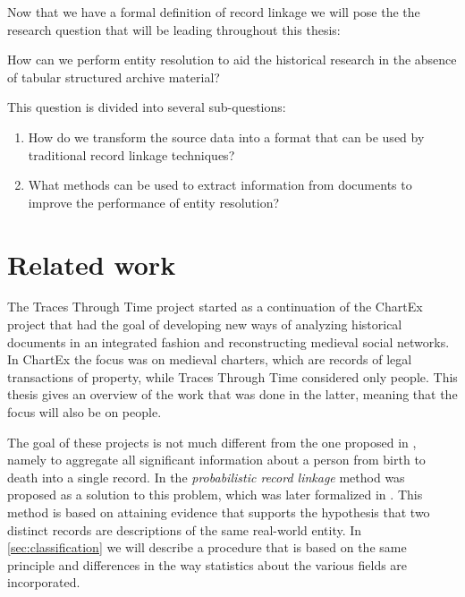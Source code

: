Now that we have a formal definition of record linkage we will pose the the research question that will be leading throughout this thesis:

\begin{question*}
    How can we perform entity resolution to aid the historical research in the absence of tabular structured archive material?
\end{question*}

\noindent This question is divided into several sub-questions:

\begin{enumerate}[label=\emph{\roman*.}]
    \item How do we transform the source data into a format that can be used by traditional record linkage techniques?
    \item What methods can be used to extract information from documents to improve the performance of entity resolution?
\end{enumerate}




\section{Related work}
\label{sec:related_work}

The Traces Through Time project started as a continuation of the ChartEx \citep{Knobbe2014} project that had the goal of developing new ways of analyzing historical documents in an integrated fashion and reconstructing medieval social networks.
In ChartEx the focus was on medieval charters, which are records of legal transactions of property, while Traces Through Time considered only people.
This thesis gives an overview of the work that was done in the latter, meaning that the focus will also be on people.

The goal of these projects is not much different from the one proposed in \citep{Dunn1946}, namely to aggregate all significant information about a person from birth to death into a single record.
In \citep{Newcombe1959} the \emph{probabilistic record linkage} method was proposed as a solution to this problem, which was later formalized in \citep{Fellegi1969}.
This method is based on attaining evidence that supports the hypothesis that two distinct records are descriptions of the same real-world entity.
In \cref{sec:classification} we will describe a procedure that is based on the same principle and differences in the way statistics about the various fields are incorporated.

